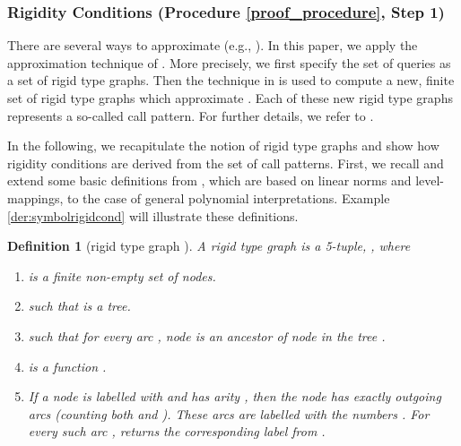 \documentclass[envcountsame]{tlp}
\newcounter{ex:der-lastsymconsctr}
\newtheorem{definition}{Definition}
\begin{document}
 
\subsubsection{Rigidity Conditions (Procedure \ref{proof_procedure}, Step 1)}\label{Rigidity Conditions}\hspace*{\fill}

\vspace*{.2cm}



\noindent
There are several ways to approximate  (e.g.,
\cite{Bruynoogheetal05,GallagherHB05,HeatonACK00,Janssensetal92}). 
In this paper, we apply the approximation technique
of \cite{GallagherHB05,Janssensetal92}. More precisely, we first
specify the set of queries as a set of rigid
type graphs. 
Then the technique in \cite{GallagherHB05,Janssensetal92} is used to 
compute a new, finite set of rigid type graphs which 
approximate
. Each of these new rigid type graphs represents
 a so-called
call pattern.
For further details, we
refer to \cite{GallagherHB05,Janssensetal92}.  

In the following, we 
recapitulate the notion of rigid type graphs
and show how rigidity conditions are derived from the set of call patterns. First,
we recall and extend some basic definitions from 
\cite{Janssensetal92}, which are based on linear norms and
level-mappings, to the case of general polynomial
interpretations.  Example \ref{der:symbolrigidcond} will illustrate these definitions.




\begin{definition}[rigid type graph \cite{Janssensetal92}] 
\label{rigidtypegraph}
A rigid type graph  is a 5-tuple, , where 
\begin{enumerate}
    \item[1.]  is a finite non-empty set of nodes.
    \item[2.]  such that 
 is a tree.
    \item[3.] 
 such that for every
arc , node  is an ancestor of node  in the tree .
    \item[4.]  is a function .
    \item[5.] If a node  is labelled with  and  has arity , then the node  has exactly  outgoing arcs (counting both 
and ). These arcs are labelled with the numbers
.  For every such arc ,  returns
the corresponding label from .
\end{enumerate}
\end{definition}
\end{document}
